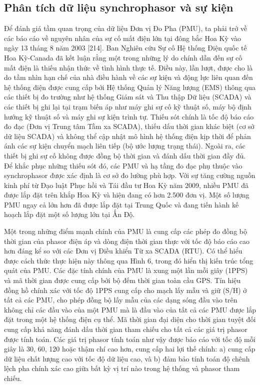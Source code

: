 \documentclass[utf8]{frontiersSCNS} %
\begin{document}
\subsection{Phân tích dữ liệu synchrophasor và sự kiện}
Để đánh giá tầm quan trọng của dữ liệu Đơn vị Đo Pha (PMU), ta phải trở về các báo cáo về nguyên nhân của sự cố mất điện lớn tại đông bắc Hoa Kỳ vào ngày 13 tháng 8 năm 2003 [214]. Ban Nghiên cứu Sự cố Hệ thống Điện quốc tế Hoa Kỳ-Canada đã kết luận rằng một trong những lý do chính dẫn đến sự cố mất điện là thiếu nhận thức về tình hình thực tế. Điều này, lần lượt, được cho là do tầm nhìn hạn chế của nhà điều hành về các sự kiện và động lực liên quan đến hệ thống điện được cung cấp bởi Hệ thống Quản lý Năng lượng (EMS) thông qua các thiết bị đo trường như hệ thống Giám sát và Thu thập Dữ liệu (SCADA) và các thiết bị ghi lại tại trạm biến áp như máy ghi sự cố kỹ thuật số, máy bộ định hướng kỹ thuật số và máy ghi sự kiện trình tự. Thiếu sót chính là tốc độ báo cáo đo đạc (Đơn vị Trung tâm Tầm xa SCADA), thiếu dấu thời gian khác biệt (cơ sở dữ liệu SCADA) và không thể cập nhật mô hình hệ thống điện kịp thời để phản ánh các sự kiện chuyển mạch liên tiếp (bộ ước lượng trạng thái). Ngoài ra, các thiết bị ghi sự cố không được đồng bộ thời gian và đánh dấu thời gian đầy đủ. Để khắc phục những thiếu sót đó, các PMU và hạ tầng đo đạc phụ thuộc vào synchrophasor được xác định là cơ sở đo lường phù hợp. Với sự tăng cường nguồn kinh phí từ Đạo luật Phục hồi và Tái đầu tư Hoa Kỳ năm 2009, nhiều PMU đã được lắp đặt trên khắp Hoa Kỳ và hiện đang có hơn 2.500 đơn vị. Một số lượng PMU ngay cả lớn hơn đã được lắp đặt tại Trung Quốc và đang tiến hành kế hoạch lắp đặt một số lượng lớn tại Ấn Độ.

Một trong những điểm mạnh chính của PMU là cung cấp các phép đo đồng bộ thời gian của phasor điện áp và dòng điện thời gian thực với tốc độ báo cáo cao hơn đáng kể so với các Đơn vị Điều khiển Từ xa SCADA (RTU). Có thể hiểu được cách thức thực hiện này thông qua Hình 6, trong đó hiển thị kiến trúc tổng quát của PMU. Các đặc tính chính của PMU là xung một lần mỗi giây (1PPS) và mã thời gian được cung cấp bởi bộ đếm thời gian toàn cầu GPS. Tín hiệu đồng hồ chính xác với tốc độ 1PPS cung cấp cho mạch lấy mẫu và giữ (S/H) ở tất cả các PMU, cho phép đồng bộ lấy mẫu của các dạng sóng đầu vào trên không chỉ các đầu vào của một PMU mà là đầu vào của tất cả các PMU được lắp đặt trong một hệ thống điện cụ thể. Mã thời gian đại diện cho thời gian tuyệt đối cung cấp khả năng đánh dấu thời gian tham chiếu cho tất cả các giá trị phasor được tính toán. Các giá trị phasor tính toán như vậy được báo cáo với tốc độ mỗi giây là 30, 60, 120 hoặc thậm chí cao hơn, cung cấp hai lợi thế chính: a) cung cấp dữ liệu chất lượng cao với tốc độ dữ liệu cao, và b) đảm bảo tính toán độ chênh lệch pha chính xác cao giữa bất kỳ vị trí nào trong hệ thống và phasor tham chiếu.
\end{document}
